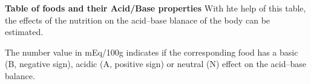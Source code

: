 \documentclass[../main.tex]{subfiles}
\begin{document}
\textbf{Table of foods and their Acid/Base properties}
With hte help of this table, the effects of the nutrition on the acid--base blanace of the body can be estimated.

The number value in mEq/100g indicates if the corresponding food has a basic (B, negative sign),
acidic (A, positive sign) or neutral (N) effect on the acid--base balance.
\end{document}

